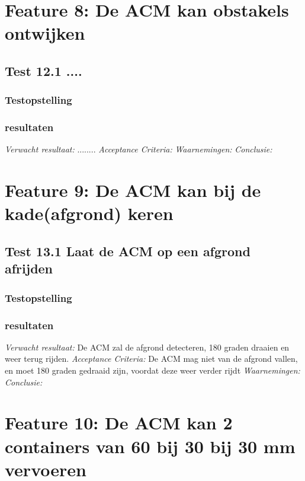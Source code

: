 \documentclass{article}
\begin{document}
\section{Feature 8: De ACM kan obstakels ontwijken}
\subsection{Test 12.1 ....}
\subsubsection{Testopstelling}
\subsubsection{resultaten}
\textit{Verwacht resultaat: } ........
\newline
\textit{Acceptance Criteria: }
\newline
\textit{Waarnemingen: }
\newline
\textit{Conclusie: }

\section{Feature 9: De ACM kan bij de kade(afgrond) keren}
\subsection{Test 13.1 Laat de ACM op een afgrond afrijden}
\subsubsection{Testopstelling}
\subsubsection{resultaten}
\textit{Verwacht resultaat: }De ACM zal de afgrond detecteren, 180 graden draaien en weer terug rijden.
\newline
\textit{Acceptance Criteria: }De ACM mag niet van de afgrond vallen, en moet 180 graden gedraaid zijn, voordat deze weer verder rijdt
\newline
\textit{Waarnemingen: }
\newline
\textit{Conclusie: }

\section{Feature 10: De ACM kan 2 containers van 60 bij 30 bij 30 mm vervoeren}
\end{document}
